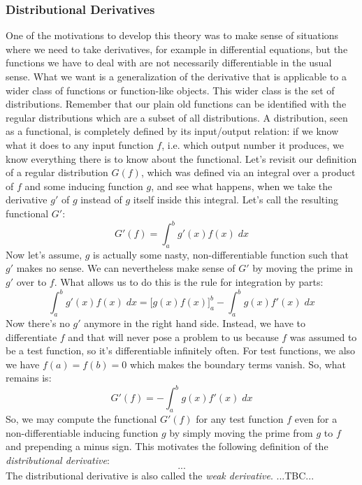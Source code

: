 \subsubsection{Distributional Derivatives}
One of the motivations to develop this theory was to make sense of situations where we need to take derivatives, for example in differential equations, but the functions we have to deal with are not necessarily differentiable in the usual sense. What we want is a generalization of the derivative that is applicable to a wider class of functions or function-like objects. This wider class is the set of distributions. Remember that our plain old functions can be identified with the regular distributions which are a subset of all distributions. A distribution, seen as a functional, is completely defined by its input/output relation: if we know what it does to any input function $f$, i.e. which output number it produces, we know everything there is to know about the functional. Let's revisit our definition of a regular distribution $G(f)$, which was defined via an integral over a product of $f$ and some inducing function $g$, and see what happens, when we take the derivative $g'$ of $g$ instead of $g$ itself inside this integral. Let's call the resulting functional $G'$:
\begin{equation}
 G'(f) = \int_a^b g'(x) f(x) \; dx
\end{equation}
Now let's assume, $g$ is actually some nasty, non-differentiable function such that $g'$ makes no sense. We can nevertheless make sense of $G'$ by moving the prime in $g'$ over to $f$. What allows us to do this is the rule for integration by parts:
\begin{equation}
 \int_a^b g'(x) f(x) \; dx = \Big[g(x) f(x)\Big]_a^b - \int_a^b g(x) f'(x) \; dx
\end{equation}
Now there's no $g'$ anymore in the right hand side. Instead, we have to differentiate $f$ and that will never pose a problem to us because $f$ was assumed to be a test function, so it's differentiable infinitely often. For test functions, we also we have $f(a) = f(b) = 0$ which makes the boundary terms vanish. So, what remains is:
\begin{equation}
 G'(f) = - \int_a^b g(x) f'(x) \; dx
\end{equation}
So, we may compute the functional $G'(f)$ for any test function $f$ even for a non-differentiable inducing function $g$ by simply moving the prime from $g$ to $f$ and prepending a minus sign. This motivates the following definition of the \emph{distributional derivative}:
\begin{equation}
  ...
\end{equation}
The distributional derivative is also called the \emph{weak derivative}. ...TBC...

